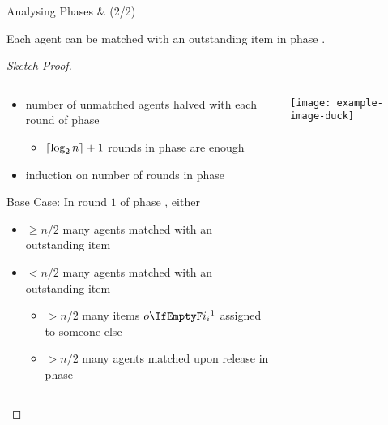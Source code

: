 \begin{frame}{Analysing Phases \phasei{} \& \phaseiii{} (2/2)}
	\adjustfortopblock
	\begin{lemma}[15]
		Each agent can be matched with an outstanding item in phase \phaseiii.
	\end{lemma}
	\begin{proof}[Sketch Proof]
		\begin{columns}[T]
			\begin{column}{0.6\textwidth}
				\begin{itemize}
					\item
					number of unmatched agents halved with each round of phase \phasei
					\begin{itemize}
						\item
						\(\lceil\log_2 n\rceil + 1\) rounds in phase \phasei{} are enough
					\end{itemize}

					\item
					induction on number of rounds in phase \phasei
				\end{itemize}
				Base Case: In round \(1\) of phase \phasei, either
				\begin{itemize}
					\item
					\(\ge n/2\) many agents matched with an outstanding item

					\item
					\(< n/2\) many agents matched with an outstanding item
					\begin{itemize}
						\item
						\(> n/2\) many items \(\asgd*{1}\) assigned to someone else

						\item
						\(> n/2\) many agents matched upon release in phase \phaseiii
					\end{itemize}
				\end{itemize}
			\end{column}
			\begin{column}{0.375\textwidth}
				\texttt{[image: example-image-duck]}
			\end{column}
		\end{columns}
		\vspace{-2ex}
	\end{proof}
\end{frame}
